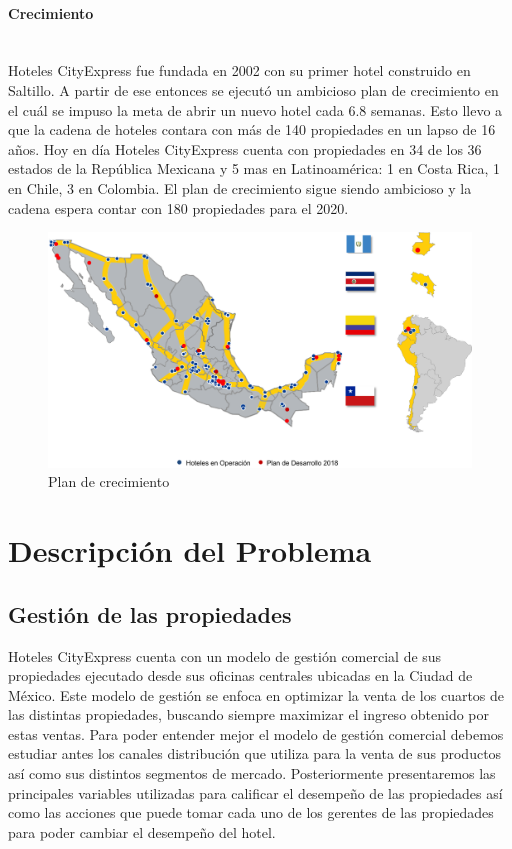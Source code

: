 \documentclass[a4paper,11pt]{article}
\begin{document}
\paragraph {Crecimiento} ~ \\
Hoteles CityExpress fue fundada en 2002 con su primer hotel construido en Saltillo. A partir de ese entonces se ejecutó un ambicioso plan de crecimiento en el cuál se impuso la meta de abrir un nuevo hotel cada 6.8 semanas. Esto llevo a que la cadena de hoteles contara con más de 140 propiedades en un lapso de 16 años.
Hoy en día Hoteles CityExpress cuenta con propiedades en 34 de los 36 estados de la República Mexicana y 5 mas en Latinoamérica: 1 en Costa Rica, 1 en Chile, 3 en Colombia. El plan de crecimiento sigue siendo ambicioso y la cadena espera contar con 180 propiedades para el 2020.
\begin{figure}[!]
  \includegraphics[width=\linewidth]{Imagenes/Ubicaciones.png}
  \caption{Plan de crecimiento}
  \label{fig:crecimiento}
\end{figure}
\section{Descripción del Problema}
\subsection{Gestión de las propiedades}
Hoteles CityExpress cuenta con un modelo de gestión comercial de sus propiedades ejecutado desde sus oficinas centrales ubicadas en la Ciudad de México. Este modelo de gestión se enfoca en optimizar la venta de los cuartos de las distintas propiedades, buscando siempre maximizar el ingreso obtenido por estas ventas.
Para poder entender mejor el modelo de gestión comercial debemos estudiar antes los canales distribución que utiliza para la venta de sus productos así como sus distintos segmentos de mercado. Posteriormente presentaremos las principales variables utilizadas para calificar el desempeño de las propiedades así como las acciones que puede tomar cada uno de los gerentes de las propiedades para poder cambiar el desempeño del hotel.
\end{document}
